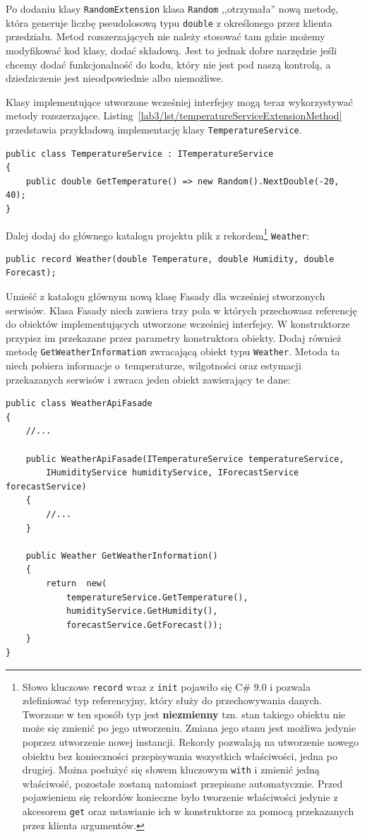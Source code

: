 Po dodaniu klasy \texttt{RandomExtension} klasa \texttt{Random} ,,otrzymała'' nową metodę, która generuje liczbę pseudolosową typu \texttt{double} z określonego przez klienta przedziału. Metod rozszerzających nie należy stosować tam gdzie możemy modyfikować kod klasy, dodać składową. Jest to jednak dobre narzędzie jeśli chcemy dodać funkcjonalność do kodu, który nie jest pod naszą kontrolą, a dziedziczenie jest nieodpowiednie albo niemożliwe. 

Klasy implementujące utworzone wcześniej interfejsy mogą teraz wykorzystywać metody rozszerzające. Listing~\ref{lab3/lst/temperatureServiceExtensionMethod} przedstawia przykładową implementację klasy \texttt{TemperatureService}.
\begin{lstlisting}[caption={Fragment klasy \texttt{TemperatureService} wykorzystującej metodę rozszerzającą}, label={lab3/lst/temperatureServiceExtensionMethod}]	
public class TemperatureService : ITemperatureService
{
	public double GetTemperature() => new Random().NextDouble(-20, 40);
}
\end{lstlisting}

Dalej dodaj do głównego katalogu projektu plik z rekordem\footnote{Słowo kluczowe \texttt{record} wraz z \texttt{init} pojawiło się C\# 9.0 i pozwala zdefiniować typ referencyjny, który służy do przechowywania danych. Tworzone w ten sposób typ jest \textbf{niezmienny} tzn. stan takiego obiektu nie może się zmienić po jego utworzeniu. Zmiana jego stanu jest możliwa jedynie poprzez utworzenie nowej instancji. Rekordy pozwalają na utworzenie nowego obiektu bez konieczności przepisywania wszystkich właściwości, jedna po drugiej. Można posłużyć się słowem kluczowym \texttt{with} i zmienić jedną właściwość, pozostałe zostaną natomiast przepisane automatycznie. Przed pojawieniem się rekordów konieczne było tworzenie właściwości jedynie z akcesorem \texttt{get} oraz ustawianie ich w konstruktorze za pomocą przekazanych przez klienta argumentów.} \texttt{Weather}:
\begin{lstlisting}	
public record Weather(double Temperature, double Humidity, double Forecast);
\end{lstlisting}

Umieść z katalogu głównym nową klasę Fasady dla wcześniej stworzonych serwisów. Klasa Fasady niech zawiera trzy pola w których przechowasz referencję do obiektów implementujących utworzone wcześniej interfejsy. W konstruktorze przypisz im przekazane przez parametry konstruktora obiekty. Dodaj również metodę \texttt{GetWeatherInformation} zwracającą obiekt typu \texttt{Weather}. Metoda ta niech pobiera informacje o~temperaturze, wilgotności oraz estymacji przekazanych serwisów i zwraca jeden obiekt zawierający te dane:
\begin{lstlisting}	
public class WeatherApiFasade
{
	//...
	
	public WeatherApiFasade(ITemperatureService temperatureService, 
		IHumidityService humidityService, IForecastService forecastService)
	{
		//...
	}
	
	public Weather GetWeatherInformation()
	{
		return  new(
			temperatureService.GetTemperature(),
			humidityService.GetHumidity(),
			forecastService.GetForecast());
	}
}
\end{lstlisting}

